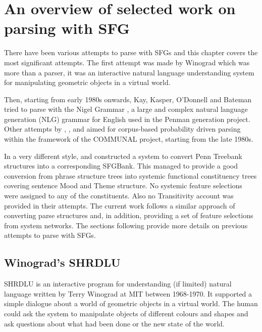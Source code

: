 \chapter{An overview of selected work on parsing with SFG}
\label{ch:sota}

    There have been various attempts to parse with SFGs and this chapter covers the most significant attempts. The first attempt was made by Winograd \citep{Winograd1972} which was more than a parser, it was an interactive natural language understanding system for manipulating geometric objects in a virtual world.
    
    Then, starting from early 1980s onwards, Kay, Kasper, O'Donnell and Bateman tried to parse with the Nigel Grammar \citep{Matthiessen1985}, a large and complex natural language generation (NLG) grammar for English used in the Penman generation project. Other attempts by \citet{ODonoghue1991a}, \citet{Weerasinghe1994}, \citet{Souter1996} and \citet{Day2007} aimed for corpus-based probability driven parsing within the framework of the COMMUNAL project, starting from the late 1980s.
    
    In a very different style, \citet{Honnibal2004a} and \citet{Honnibal2007} constructed a system to convert Penn Treebank structures into a corresponding SFGBank. This managed to provide a good conversion from phrase structure trees into systemic functional constituency trees covering sentence Mood and Theme structure. No systemic feature selections were assigned to any of the constituents. Also no Transitivity account was provided in their attempts. The current work follows a similar approach of converting parse structures and, in addition, providing a set of feature selections from system networks. The sections following provide more details on previous attempts to parse with SFGs. 

\section{Winograd's SHRDLU}

    SHRDLU is an interactive program for understanding (if limited) natural language written by Terry Winograd at MIT between 1968-1970. It supported a simple dialogue about a world of geometric objects in a virtual world. The human could ask the system to manipulate objects of different colours and shapes and ask questions about what had been done or the new state of the world. 
    
